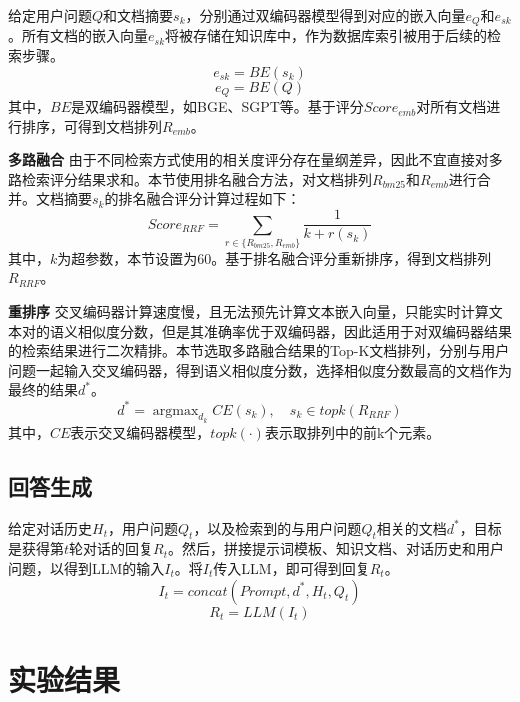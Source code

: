 给定用户问题$Q$和文档摘要$s_k$，分别通过双编码器模型得到对应的嵌入向量$e_Q$和$e_{sk}$。所有文档的嵌入向量$e_{sk}$将被存储在知识库中，作为数据库索引被用于后续的检索步骤。
\begin{equation}
	e_{sk} = BE(s_k)
\end{equation}
\begin{equation}
	e_Q = BE(Q)
\end{equation}
其中，$BE$是双编码器模型，如BGE\cite{DBLP:journals/corr/abs-2309-07597}、SGPT\cite{DBLP:journals/corr/abs-2202-08904}等。基于评分$Score_{emb}$对所有文档进行排序，可得到文档排列$R_{emb}$。

\textbf{多路融合} 由于不同检索方式使用的相关度评分存在量纲差异，因此不宜直接对多路检索评分结果求和。本节使用排名融合方法，对文档排列$R_{bm25}$和$R_{emb}$进行合并。文档摘要$s_k$的排名融合评分计算过程如下：
\begin{equation}
	Score_{RRF} = \sum_{r \in \{R_{bm25},R_{emb}\}}\frac{1}{k + r(s_k)}
\end{equation}
其中，$k$为超参数，本节设置为60。基于排名融合评分重新排序，得到文档排列$R_{RRF}$。

\textbf{重排序} 交叉编码器计算速度慢，且无法预先计算文本嵌入向量，只能实时计算文本对的语义相似度分数，但是其准确率优于双编码器，因此适用于对双编码器结果的检索结果进行二次精排。本节选取多路融合结果的Top-K文档排列，分别与用户问题一起输入交叉编码器，得到语义相似度分数，选择相似度分数最高的文档作为最终的结果$d^*$。
\begin{equation}
	d^* = \mathop{\arg\max}_{d_k}CE(s_k), \quad s_k \in topk(R_{RRF})
\end{equation}
其中，$CE$表示交叉编码器模型，$topk(\cdot)$表示取排列中的前k个元素。

\subsection{回答生成}

给定对话历史$H_t$，用户问题$Q_t$，以及检索到的与用户问题$Q_t$相关的文档$d^*$，目标是获得第$t$轮对话的回复$R_t$。然后，拼接提示词模板、知识文档、对话历史和用户问题，以得到LLM的输入$I_t$。将$I_t$传入LLM，即可得到回复$R_t$。
\begin{equation}
	I_t = concat(Prompt, d^*, H_t, Q_t)
\end{equation}
\begin{equation}
	R_t = LLM(I_t)
\end{equation}

\section{实验结果}

